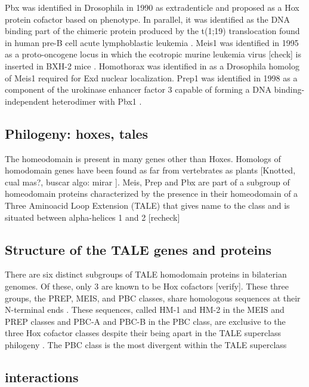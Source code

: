 Pbx was identified in Drosophila in 1990 as extradenticle \cite{Peifer1990} and proposed as a Hox protein cofactor based on phenotype. In parallel, it was identified as the DNA binding part of the chimeric protein produced by the t(1;19) translocation found in human pre-B cell acute lymphoblastic leukemia \cite{Kamps1990}. 
Meis1 was identified in 1995 as a proto-oncogene locus in which the ecotropic murine leukemia virus [check] is inserted in BXH-2 mice \cite{Moskow1995}. Homothorax was identified in \cite{Rauskolb1995, Rieckhof1997} as a Drosophila homolog of Meis1 required for Exd nuclear localization. 
Prep1 was identified in 1998 as a component of the urokinase enhancer factor 3 capable of forming a DNA binding-independent heterodimer with Pbx1 \cite{Berthelsen1998}.

\subsection{Philogeny: hoxes, tales}
The homeodomain is present in many genes other than Hoxes. Homologs of homodomain genes have been found as far from vertebrates as plants [Knotted, cual mas?, buscar algo: mirar \cite{Burglin1997}]. Meis, Prep and Pbx are part of a subgroup of homeodomain proteins characterized by the presence in their homeodomain of a Three Aminoacid Loop Extension (TALE) that gives name to the class and is situated between alpha-helices 1 and 2 [recheck] \cite{Burglin1997, Mukherjee2007, Moens2006}

\subsection{Structure of the TALE genes and proteins}
	
		There are six distinct subgroups of TALE homodomain proteins in bilaterian genomes. Of these, only 3 are known to be Hox cofactors [verify]. These three groups, the PREP, MEIS, and PBC classes, share homologous sequences at their N-terminal ends \cite{Burglin1998}. These sequences, called HM-1 and HM-2 in the MEIS and PREP classes and PBC-A and PBC-B in the PBC class, are exclusive to the three Hox cofactor classes despite their being apart in the TALE superclass philogeny \cite{Mukherjee2007}.
		The PBC class is the most divergent within the TALE superclass

\subsection{interactions}


